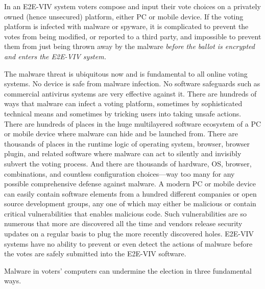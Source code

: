 In an E2E-VIV system voters compose and input their vote choices on a
privately owned (hence unsecured) platform, either PC or mobile
device. If the voting platform is infected with malware or spyware, it
is complicated to prevent the votes from being modified, or reported
to a third party, and impossible to prevent them from just being
thrown away by the malware \emph{before the ballot is encrypted and
  enters the E2E-VIV system.}

The malware threat is ubiquitous now and is fundamental to all online
voting systems. No device is safe from malware infection. No software
safeguards such as commercial antivirus systems are very effective
against it. There are hundreds of ways that malware can infect a
voting platform, sometimes by sophisticated technical means and
sometimes by tricking users into taking unsafe actions. There are
hundreds of places in the huge multilayered software ecosystem of a PC
or mobile device where malware can hide and be launched from. There
are thousands of places in the runtime logic of operating system,
browser, browser plugin, and related software where malware can act to
silently and invisibly subvert the voting process. And there are
thousands of hardware, OS, browser, combinations, and countless
configuration choices---way too many for any possible comprehensive
defense against malware. A modern PC or mobile device can easily
contain software elements from a hundred different companies or open
source development groups, any one of which may either be malicious or
contain critical vulnerabilities that enables malicious code. Such
vulnerabilities are so numerous that more are discovered all the time
and vendors release security updates on a regular basis to plug the
more recently discovered holes. E2E-VIV systems have no ability to
prevent or even detect the actions of malware before the votes are
safely submitted into the E2E-VIV software.

Malware in voters' computers can undermine the election in three
fundamental ways. 

